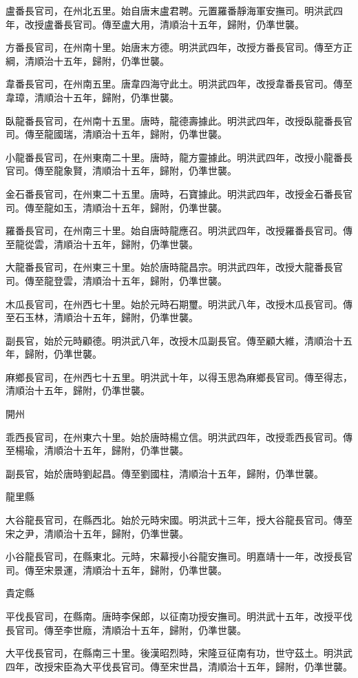 \begin{pinyinscope}
盧番長官司，在州北五里。始自唐末盧君聘。元置羅番靜海軍安撫司。明洪武四年，改授盧番長官司。傳至盧大用，清順治十五年，歸附，仍準世襲。

方番長官司，在州南十里。始唐末方德。明洪武四年，改授方番長官司。傳至方正綱，清順治十五年，歸附，仍準世襲。

韋番長官司，在州南五里。唐韋四海守此土。明洪武四年，改授韋番長官司。傳至韋璋，清順治十五年，歸附，仍準世襲。

臥龍番長官司，在州南十五里。唐時，龍德壽據此。明洪武四年，改授臥龍番長官司。傳至龍國瑞，清順治十五年，歸附，仍準世襲。

小龍番長官司，在州東南二十里。唐時，龍方靈據此。明洪武四年，改授小龍番長官司。傳至龍象賢，清順治十五年，歸附，仍準世襲。

金石番長官司，在州東二十五里。唐時，石寶據此。明洪武四年，改授金石番長官司。傳至龍如玉，清順治十五年，歸附，仍準世襲。

羅番長官司，在州南三十里。始自唐時龍應召。明洪武四年，改授羅番長官司。傳至龍從雲，清順治十五年，歸附，仍準世襲。

大龍番長官司，在州東三十里。始於唐時龍昌宗。明洪武四年，改授大龍番長官司。傳至龍登雲，清順治十五年，歸附，仍準世襲。

木瓜長官司，在州西七十里。始於元時石期璽。明洪武八年，改授木瓜長官司。傳至石玉林，清順治十五年，歸附，仍準世襲。

副長官，始於元時顧德。明洪武八年，改授木瓜副長官。傳至顧大維，清順治十五年，歸附，仍準世襲。

麻鄉長官司，在州西七十五里。明洪武十年，以得玉思為麻鄉長官司。傳至得志，清順治十五年，歸附，仍準世襲。

開州

乖西長官司，在州東六十里。始於唐時楊立信。明洪武四年，改授乖西長官司。傳至楊瑜，清順治十五年，歸附，仍準世襲。

副長官，始於唐時劉起昌。傳至劉國柱，清順治十五年，歸附，仍準世襲。

龍里縣

大谷龍長官司，在縣西北。始於元時宋國。明洪武十三年，授大谷龍長官司。傳至宋之尹，清順治十五年，歸附，仍準世襲。

小谷龍長官司，在縣東北。元時，宋幕授小谷龍安撫司。明嘉靖十一年，改授長官司。傳至宋景運，清順治十五年，歸附，仍準世襲。

貴定縣

平伐長官司，在縣南。唐時李保郎，以征南功授安撫司。明洪武十五年，改授平伐長官司。傳至李世廕，清順治十五年，歸附，仍準世襲。

大平伐長官司，在縣南三十里。後漢昭烈時，宋隆豆征南有功，世守茲土。明洪武四年，改授宋臣為大平伐長官司。傳至宋世昌，清順治十五年，歸附，仍準世襲。


\end{pinyinscope}
